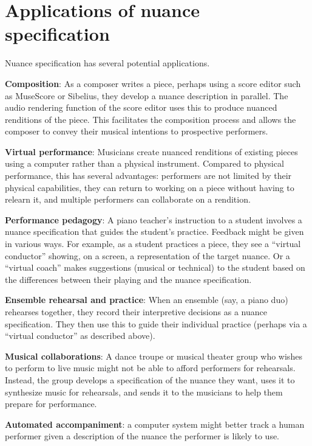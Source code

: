 \documentclass[letterpaper, 12pt]{article}
\begin{document}
\section{Applications of nuance specification}

Nuance specification has several potential applications.

\textbf{Composition}:
As a composer writes a piece,
perhaps using a score editor such as MuseScore or Sibelius,
they develop a nuance description in parallel.
The audio rendering function of the score editor
uses this to produce nuanced renditions of the piece.
This facilitates the composition process
and allows the composer to convey their musical intentions
to prospective performers.

\textbf{Virtual performance}:
Musicians create nuanced renditions of existing pieces
using a computer rather than a physical instrument.
Compared to physical performance, this has several advantages:
performers are not limited by their physical capabilities,
they can return to working on a piece without having to relearn it,
and multiple performers can collaborate on a rendition.

\textbf{Performance pedagogy}:
A piano teacher's instruction to a student involves
a nuance specification that guides the student's practice.
Feedback might be given in various ways.
For example, as a student practices a piece, they see a
``virtual conductor'' showing, on a screen,
a representation of the target nuance.
Or a ``virtual coach'' makes suggestions
(musical or technical) to the student based on
the differences between their playing and the nuance specification.

\textbf{Ensemble rehearsal and practice}:
When an ensemble (say, a piano duo) rehearses together,
they record their interpretive decisions as a nuance specification.
They then use this to guide their individual practice
(perhaps via a ``virtual conductor'' as described above).

\textbf{Musical collaborations}:
A dance troupe or musical theater group who
wishes to perform to live music might
not be able to afford performers for rehearsals.
Instead, the group develops a specification of the nuance they want,
uses it to synthesize music for rehearsals,
and sends it to the musicians to help them prepare for performance.

\textbf{Automated accompaniment}:
a computer system might better track a human performer
given a description of the nuance
the performer is likely to use.
\end{document}

